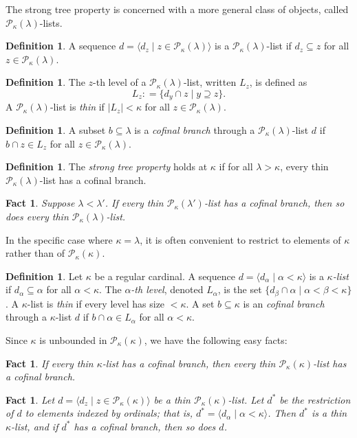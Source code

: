\documentclass[psamsfonts]{amsart}
\newtheorem{fact}[thm]{Fact}
\theoremstyle{definition}
\newtheorem{defn}[thm]{Definition}
\newcommand{\defeq}{\mathrel{\mathop:}=}
\newcommand{\la}{\lambda}
\newcommand{\ka}{\kappa}
\newcommand{\mc}{\mathcal}
\numberwithin{equation}{section}
\begin{document}
The strong tree property is concerned with a more general class of objects, called $\mc{P}_\ka(\la)$-lists.

\begin{defn}
	A sequence $d = \langle d_z \mid z\in \mc{P}_\ka(\la)\rangle$ is a $\mc{P}_\ka(\la)$-list if $d_z\subseteq z$ for all $z \in \mc{P}_\ka(\la)$.
\end{defn}
\begin{defn}
	The $z$-th level of a $\mc{P}_\ka(\la)$-list, written $L_z$, is defined as
	\[L_z \defeq \{d_y\cap z \mid y \supseteq z\}.\]
	A $\mc{P}_\ka(\la)$-list is \emph{thin} if $|L_z|<\ka$ for all $z\in \mc{P}_\ka(\la)$.
\end{defn}
\begin{defn}
	A subset $b\subseteq \la$ is a \emph{cofinal branch} through a $\mc{P}_\ka(\la)$-list $d$ if $b\cap z \in L_z$ for all $z\in \mc{P}_\ka(\la)$.
\end{defn}
\begin{defn}
	The \emph{strong tree property} holds at $\ka$ if for all $\la > \ka$, every thin $\mc{P}_\ka(\la)$-list has a cofinal branch.
\end{defn}
\begin{fact}\cite[Lemma 3.4]{fontanella:stpsuccsing}\label{fact:tpgoesdown}
	Suppose $\la < \la'$. If every thin $\mc{P}_\ka(\la')$-list has a cofinal branch, then so does every thin $\mc{P}_\ka(\la)$-list.
\end{fact}

In the specific case where $\ka = \la$, it is often convenient to restrict to elements of $\ka$ rather than of $\mc{P}_\ka(\ka)$.

\begin{defn}
	Let $\ka$ be a regular cardinal. A sequence $d = \langle d_\alpha \mid \alpha < \ka\rangle$ is a \emph{$\ka$-list} if $d_\alpha \subseteq \alpha$ for all $\alpha < \ka$. The \emph{$\alpha$-th level}, denoted $L_\alpha$, is the set $\{d_\beta \cap \alpha \mid \alpha < \beta < \ka\}$. A $\ka$-list is \emph{thin} if every level has size $<\ka$. A set $b \subseteq \ka$ is an \emph{cofinal branch} through a $\kappa$-list $d$ if $b\cap \alpha \in L_\alpha$ for all $\alpha < \ka$.
\end{defn}

Since $\ka$ is unbounded in $\mc{P}_\ka(\ka)$, we have the following easy facts:
\begin{fact}\label{fact:ka-lists(ka,ka)-lists}
If every thin $\ka$-list has a cofinal branch, then every thin $\mc{P}_\ka(\ka)$-list has a cofinal branch.
\end{fact}
\begin{fact}\label{fact:ka-lists2}
	Let $d = \langle d_z\mid z\in \mc{P}_\ka(\ka)\rangle$ be a thin $\mc{P}_{\ka}(\ka)$-list. Let $d^*$ be the restriction of $d$ to elements indexed by ordinals; that is, $d^* = \langle d_\alpha \mid \alpha < \ka\rangle$. Then $d^*$ is a thin $\ka$-list, and if $d^*$ has a cofinal branch, then so does $d$.
\end{fact}
\end{document}
